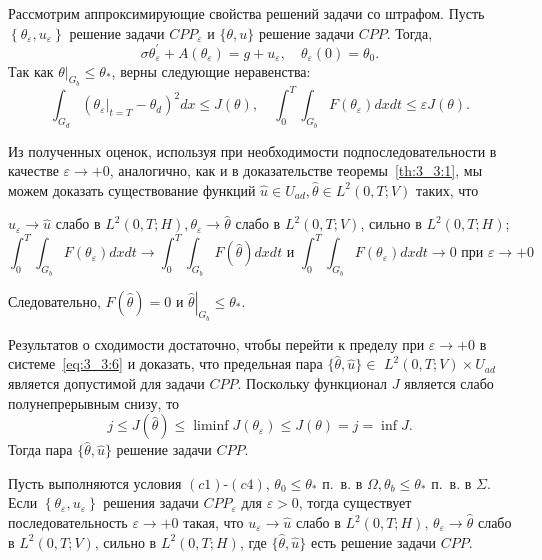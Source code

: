 Рассмотрим аппроксимирующие свойства решений задачи со штрафом.
Пусть $\left\{\theta_{\varepsilon}, u_{\varepsilon}\right\}$ решение задачи
$CPP_{\varepsilon}$ и $\{\theta, u\}$ решение задачи $CPP$.
Тогда,
\begin{equation}
    \label{eq:3_3:6}
    \sigma \theta_{\varepsilon}^{\prime}
    + A\left(\theta_{\varepsilon}\right)=g + u_{\varepsilon},
    \quad \theta_{\varepsilon}(0) = \theta_{0}.
\end{equation}
Так как $\left.\theta\right|_{G_{b}} \leq \theta_{*}$, верны следующие неравенства:
\[
    \int_{G_{d}}\left(\left.\theta_{\varepsilon}\right|_{t=T}-\theta_{d}\right)^{2} d x \leq J(\theta),
    \quad \int_{0}^{T} \int_{G_{b}} F\left(\theta_{\varepsilon}\right) d x d t \leq \varepsilon J(\theta).
\]


Из полученных оценок, используя при необходимости подпоследовательности в качестве
$\varepsilon \rightarrow+0$, аналогично, как и в доказательстве теоремы~\ref{th:3_3:1},
мы можем доказать существование функций
$\widehat{u} \in U_{a d}, \widehat{\theta} \in L^{2}(0, T ; V)$ таких, что

$u_{\varepsilon} \rightarrow \widehat{u}$ слабо в
$L^{2}(0, T ; H), \theta_{\varepsilon} \rightarrow \widehat{\theta}$ слабо в $L^{2}(0, T ; V)$,
сильно в $L^{2}(0, T ; H)$;
\[
    \int_{0}^{T} \int_{G_{b}} F\left(\theta_{\varepsilon}\right) d x d t \rightarrow \int_{0}^{T}
    \int_{G_{b}} F(\widehat{\theta}) dx dt\text { и }\int_{0}^{T} \int_{G_{b}}
    F\left(\theta_{\varepsilon}\right) dx dt \rightarrow 0
    \text{ при } \varepsilon \rightarrow+0
\]

Следовательно, $F(\widehat{\theta})=0$ и
$\left.\widehat{\theta}\right|_{G_{b}} \leq \theta_{*}$.

Результатов о сходимости достаточно, чтобы перейти к пределу при $\varepsilon \rightarrow+0$
в системе~\eqref{eq:3_3:6} и доказать, что предельная пара
$\{\widehat{\theta}, \widehat{u}\} \in$ $L^{2}(0, T ; V) \times U_{a d}$
является допустимой для задачи $CPP$.
Поскольку функционал $J$ является слабо полунепрерывным снизу, то
\[
    j \leq J(\widehat{\theta}) \leq \liminf J\left(\theta_{\varepsilon}\right) \leq J(\theta)=j=\inf J.
\]
Тогда пара $\{\widehat{\theta}, \widehat{u}\}$ решение задачи $CPP$.
\begin{theorem}
    Пусть выполняются условия $(c1)$-$(c4)$,
    $\theta_{0} \leq \theta_{*}$ п.\ в. в $\Omega, \theta_{b} \leq \theta_{*}$ п.\ в. в
    $\Sigma$.
    Если $\left\{\theta_{\varepsilon}, u_{\varepsilon}\right\}$ решения задачи
    $CPP_{\varepsilon}$ для $\varepsilon>0$, тогда существует последовательность
    $\varepsilon \rightarrow+0$ такая, что $u_{\varepsilon} \rightarrow \widehat{u}$ слабо в
    $L^{2}(0, T ; H), \, \theta_{\varepsilon} \rightarrow \widehat{\theta}$
    слабо в $L^{2}(0, T ; V)$, сильно в $L^{2}(0, T ; H)$, где
    $\{\widehat{\theta}, \widehat{u}\}$ есть решение задачи $CPP$.
\end{theorem}
